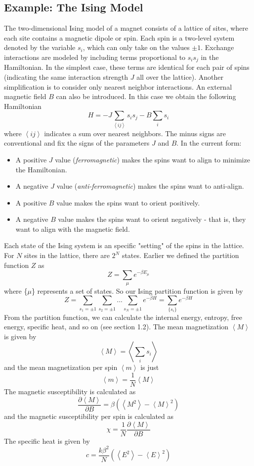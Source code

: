 \documentclass{article}
\begin{document}
\subsection{Example: The Ising Model}
The two-dimensional Ising model of a magnet consists of a lattice of sites, where
each site contains a magnetic dipole or spin. Each spin is a two-level system
denoted by the variable $s_{i}$, which can only take on the values $\pm 1$. Exchange
interactions are modeled by including terms proportional to $s_{i}s_{j}$ in the
Hamiltonian. In the simplest case, these terms are identical for each pair of spins
(indicating the same interaction strength $J$ all over the lattice). Another simplification
is to consider only nearest neighbor interactions. An external magnetic field $B$
can also be introduced. In this case we obtain the following Hamiltonian
$$H = -J\sum_{\left \langle ij \right \rangle }s_{i}s_{j} - B\sum_{i}s_{i}$$
where $\left \langle ij \right \rangle$ indicates a sum over nearest neighbors. The minus
signs are conventional and fix the signs of the parameters $J$ and $B$. In the current form:
\begin{itemize}
\item A positive $J$ value (\emph{ferromagnetic}) makes the spins want to align to minimize the Hamiltonian.
\item A negative $J$ value (\emph{anti-ferromagnetic}) makes the spins want to anti-align.
\item A positive $B$ value makes the spins want to orient positively.
\item A negative $B$ value makes the spins want to orient negatively - that is, they
want to align with the magnetic field.
\end{itemize}
Each state of the Ising system is an specific "setting" of the spins in the lattice. For $N$
sites in the lattice, there are $2^{N}$ states. Earlier we defined the partition function
$Z$ as
$$Z = \sum_{\mu}e^{-\beta E_{\mu}}$$
where \{$\mu$\} represents a set of states. So our Ising partition function is given by
$$Z = \sum_{s_{1} = \pm 1} \sum_{s_{2} = \pm 1}...\sum_{s_{N}=\pm 1}e^{-\beta H} = \sum_{\{s_{i}\}} e^{-\beta H}$$
From the partition function, we can calculate the internal energy, entropy, free energy, specific heat, and so on (see section
1.2). The mean magnetization $\left \langle M \right \rangle $ is given by
$$\left \langle M \right \rangle  = \left \langle \sum_{i}s_{i} \right \rangle $$
and the mean magnetization per spin $\left \langle m \right \rangle$ is just
$$\left \langle m \right \rangle = \frac{1}{N} \left \langle M \right \rangle $$
The magnetic susceptibility is calculated as
$$\frac{\partial \left \langle M \right \rangle }{\partial B} = \beta (\left \langle M^{2} \right \rangle - \left \langle M \right \rangle^{2}  )$$
and the magnetic susceptibility per spin is calculated as
$$\chi = \frac{1}{N}\frac{\partial \left \langle M \right \rangle }{\partial B}$$
The specific heat is given by
$$c = \frac{k\beta^{2}}{N}(\left \langle E^{2} \right \rangle - \left \langle E \right \rangle^{2}  )$$
\end{document}
